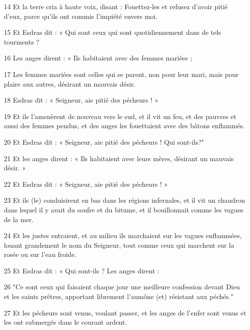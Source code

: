 \par 14 Et la terre cria à haute voix, disant : Fouettez-les et refusez d'avoir pitié d'eux, parce qu'ils ont commis l'impiété envers moi.

\par 15 Et Esdras dit : « Qui sont ceux qui sont quotidiennement dans de tels tourments ?

\par 16 Les anges dirent : « Ils habitaient avec des femmes mariées ;

\par 17 Les femmes mariées sont celles qui se parent, non pour leur mari, mais pour plaire aux autres, désirant un mauvais désir.

\par 18 Esdras dit : « Seigneur, aie pitié des pécheurs ! »

\par 19 Et ils l'amenèrent de nouveau vers le sud, et il vit un feu, et des pauvres et aussi des femmes pendus, et des anges les fouettaient avec des bâtons enflammés.

\par 20 Et Esdras dit : « Seigneur, aie pitié des pécheurs ! Qui sont-ils?"

\par 21 Et les anges dirent : « Ils habitaient avec leurs mères, désirant un mauvais désir. »

\par 22 Et Esdras dit : « Seigneur, aie pitié des pécheurs ! »

\par 23 Et ils (le) conduisirent en bas dans les régions infernales, et il vit un chaudron dans lequel il y avait du soufre et du bitume, et il bouillonnait comme les vagues de la mer.

\par 24 Et les justes entraient, et au milieu ils marchaient sur les vagues enflammées, louant grandement le nom du Seigneur, tout comme ceux qui marchent sur la rosée ou sur l'eau froide.

\par 25 Et Esdras dit : « Qui sont-ils ? Les anges dirent :

\par 26 "Ce sont ceux qui faisaient chaque jour une meilleure confession devant Dieu et les saints prêtres, apportant librement l'aumône (et) résistant aux péchés."

\par 27 Et les pécheurs sont venus, voulant passer, et les anges de l'enfer sont venus et les ont submergés dans le courant ardent.

